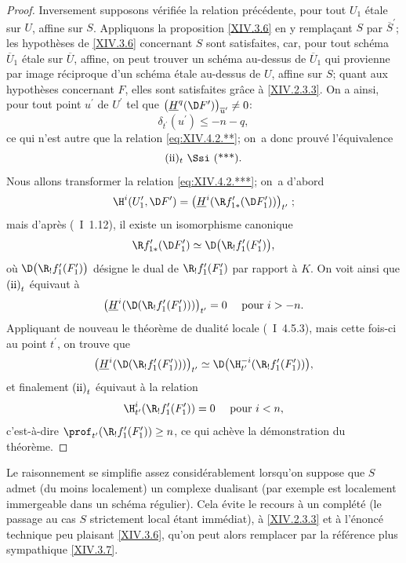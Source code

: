 \begin{proof}
Inversement supposons v\'erifi\'ee la relation pr\'ec\'edente, pour tout $U_{1}$ \'etale sur $U$, affine sur $S$. Appliquons la proposition \ref{XIV.3.6} en y rempla\c cant $S$ par $\overline{S}^{\prime}$; les hypoth\`eses de \ref{XIV.3.6} concernant $S$ sont satisfaites, car, pour tout sch\'ema $\overline{U}_{1}$ \'etale sur $\overline{U}$, affine, on peut trouver un sch\'ema au-dessus de $\overline{U}_{1}$ qui provienne par image r\'eciproque d'un sch\'ema \'etale au-dessus de $U$, affine sur $S$; quant aux hypoth\`eses concernant $F$, elles sont satisfaites gr\^ace \`a \ref{XIV.2.3.3}. On a ainsi, pour tout point $u^{\prime}$ de $U^{\prime}$ tel que $\big(\underline{H}^{q}(\D F^{\prime})\big)_{\overline{u}^{\prime}}\neq 0$:
$$
\delta_{t^{\prime}}(u^{\prime})\leq -n-q,
$$
ce qui n'est autre que la relation \eqref{eq:XIV.4.2.**}; on~a donc prouv\'e l'\'equivalence
$$
\text{(ii)$_{t}$~$\Ssi$~(***)}.
$$
Nous allons transformer la relation \eqref{eq:XIV.4.2.***}; on~a d'abord
$$
\H^{i}(U_{1}^{\prime}, \D F^{\prime})=\big(\underline{H}^{i}(\R f_{1\ast}^{\prime}(\D F_{1}^{\prime}))\big)_{t^{\prime}}\;;$$
mais d'apr\`es (~I~1.12), il existe un isomorphisme canonique
$$
\R f_{1\ast}^{\prime}(\D F_{1}^{\prime})\simeq\D\big(\R_{!}f_{1}^{\prime}(F_{1}^{\prime})\big),
$$
o\`u $\D\big(\R_{!}f_{1}^{\prime}(F_{1}^{\prime})\big)$ d\'esigne le dual de $\R_{!}f_{1}^{\prime}(F_{1}^{\prime})$ par rapport \`a $K$. On voit ainsi que $\textup{(ii)}_{t}$ \'equivaut \`a
$$
\big(\underline{H}^{i}(\D(\R_{!}f_{1}^{\prime}(F_{1}^{\prime})))\big)_{t^{\prime}}=0\quad\textrm{ pour }i>-n.
$$
Appliquant de nouveau le th\'eor\`eme de dualit\'e locale (~I~4.5.3), mais cette fois-ci au point $t^{\prime}$, on trouve que
$$
\big(\underline{H}^{i}(\D(\R_{!}f_{1}^{\prime}(F_{1}^{\prime})))\big)_{t^{\prime}}\simeq\D\big(\H_{t^{\prime}}^{-i}(\R_{!}f_{1}^{\prime}(F_{1}^{\prime}))\big),
$$
et finalement $\textup{(ii)}_{t}$ \'equivaut \`a la relation
$$
\H_{t^{\prime}}^{i}(\R_{!}f_{1}^{\prime}(F_{1}^{\prime}))=0\quad\textrm{ pour }i<n,
$$
c'est-\`a-dire $\prof_{t^{\prime}}(\R_{!}f_{1}^{\prime}(F_{1}^{\prime}))\geq n$, ce qui ach\`eve la d\'emonstration du th\'eor\`eme.
\skipqed
\end{proof}

\begin{subremarque} \label{XIV.4.2.3}
Le raisonnement se simplifie assez consid\'erablement lorsqu'on suppose que $S$ admet (du moins localement) un complexe dualisant (par exemple est localement immergeable dans un sch\'ema r\'egulier). Cela \'evite le recours \`a un compl\'et\'e (le passage au cas $S$ strictement local \'etant imm\'ediat), \`a \ref{XIV.2.3.3} et \`a l'\'enonc\'e technique peu plaisant \ref{XIV.3.6}, qu'on peut alors remplacer par la r\'ef\'erence plus sympathique \ref{XIV.3.7}.
\end{subremarque}

